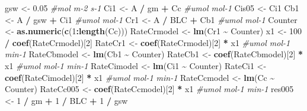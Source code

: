 \documentclass[
]{krantz}
\makeatletter
\newenvironment{Shaded}{\begin{snugshade}}{\end{snugshade}}
\newcommand{\CommentTok}[1]{\textcolor[rgb]{0.56,0.35,0.01}{\textit{#1}}}
\newcommand{\DecValTok}[1]{\textcolor[rgb]{0.00,0.00,0.81}{#1}}
\newcommand{\FloatTok}[1]{\textcolor[rgb]{0.00,0.00,0.81}{#1}}
\newcommand{\KeywordTok}[1]{\textcolor[rgb]{0.13,0.29,0.53}{\textbf{#1}}}
\newcommand{\NormalTok}[1]{#1}
\newcommand{\OperatorTok}[1]{\textcolor[rgb]{0.81,0.36,0.00}{\textbf{#1}}}
\newcommand{\StringTok}[1]{\textcolor[rgb]{0.31,0.60,0.02}{#1}}
\newenvironment{kframe}{%
\medskip{}
\setlength{\fboxsep}{.8em}
 \def\at@end@of@kframe{}%
 \ifinner\ifhmode%
  \def\at@end@of@kframe{\end{minipage}}%
  \begin{minipage}{\columnwidth}%
 \fi\fi%
 \def\FrameCommand##1{\hskip\@totalleftmargin \hskip-\fboxsep
 \colorbox{shadecolor}{##1}\hskip-\fboxsep
     \hskip-\linewidth \hskip-\@totalleftmargin \hskip\columnwidth}%
 \MakeFramed {\advance\hsize-\width
   \@totalleftmargin\z@ \linewidth\hsize
   \@setminipage}}%
 {\par\unskip\endMakeFramed%
 \at@end@of@kframe}
\renewenvironment{Shaded}{\begin{kframe}}{\end{kframe}}
\makeatother
\begin{document}
\begin{Shaded}
\begin{Highlighting}[]
\NormalTok{gsw \textless{}{-}}\StringTok{ }\FloatTok{0.05} \CommentTok{\#mol m{-}2 s{-}1}
\NormalTok{Ci1 \textless{}{-}}\StringTok{ }\NormalTok{A }\OperatorTok{/}\StringTok{ }\NormalTok{gm }\OperatorTok{+}\StringTok{ }\NormalTok{Cc }\CommentTok{\#umol mol{-}1}
\NormalTok{Cis05 \textless{}{-}}\StringTok{ }\NormalTok{Ci1}
\NormalTok{Cb1 \textless{}{-}}\StringTok{ }\NormalTok{A }\OperatorTok{/}\StringTok{ }\NormalTok{gsw }\OperatorTok{+}\StringTok{ }\NormalTok{Ci1 }\CommentTok{\#umol mol{-}1}
\NormalTok{Cr1 \textless{}{-}}\StringTok{ }\NormalTok{A }\OperatorTok{/}\StringTok{ }\NormalTok{BLC }\OperatorTok{+}\StringTok{ }\NormalTok{Cb1 }\CommentTok{\#umol mol{-}1}
\NormalTok{Counter \textless{}{-}}\StringTok{ }\KeywordTok{as.numeric}\NormalTok{(}\KeywordTok{c}\NormalTok{(}\DecValTok{1}\OperatorTok{:}\KeywordTok{length}\NormalTok{(Cc)))}
\NormalTok{RateCrmodel \textless{}{-}}\StringTok{ }\KeywordTok{lm}\NormalTok{(Cr1 }\OperatorTok{\textasciitilde{}}\StringTok{ }\NormalTok{Counter)}
\NormalTok{x1 \textless{}{-}}\StringTok{ }\DecValTok{100} \OperatorTok{/}\StringTok{ }\KeywordTok{coef}\NormalTok{(RateCrmodel)[}\DecValTok{2}\NormalTok{]}
\NormalTok{RateCr1 \textless{}{-}}\StringTok{ }\KeywordTok{coef}\NormalTok{(RateCrmodel)[}\DecValTok{2}\NormalTok{] }\OperatorTok{*}\StringTok{ }\NormalTok{x1 }\CommentTok{\#umol mol{-}1 min{-}1}
\NormalTok{RateCbmodel \textless{}{-}}\StringTok{ }\KeywordTok{lm}\NormalTok{(Cb1 }\OperatorTok{\textasciitilde{}}\StringTok{ }\NormalTok{Counter)}
\NormalTok{RateCb1 \textless{}{-}}\StringTok{ }\KeywordTok{coef}\NormalTok{(RateCbmodel)[}\DecValTok{2}\NormalTok{] }\OperatorTok{*}\StringTok{ }\NormalTok{x1 }\CommentTok{\#umol mol{-}1 min{-}1}
\NormalTok{RateCimodel \textless{}{-}}\StringTok{ }\KeywordTok{lm}\NormalTok{(Ci1 }\OperatorTok{\textasciitilde{}}\StringTok{ }\NormalTok{Counter)}
\NormalTok{RateCi1 \textless{}{-}}\StringTok{ }\KeywordTok{coef}\NormalTok{(RateCimodel)[}\DecValTok{2}\NormalTok{] }\OperatorTok{*}\StringTok{ }\NormalTok{x1 }\CommentTok{\#umol mol{-}1 min{-}1}
\NormalTok{RateCcmodel \textless{}{-}}\StringTok{ }\KeywordTok{lm}\NormalTok{(Cc }\OperatorTok{\textasciitilde{}}\StringTok{ }\NormalTok{Counter)}
\NormalTok{RateCc005 \textless{}{-}}\StringTok{ }\KeywordTok{coef}\NormalTok{(RateCcmodel)[}\DecValTok{2}\NormalTok{] }\OperatorTok{*}\StringTok{ }\NormalTok{x1 }\CommentTok{\#umol mol{-}1 min{-}1}
\NormalTok{res005 \textless{}{-}}\StringTok{ }\DecValTok{1} \OperatorTok{/}\StringTok{ }\NormalTok{gm }\OperatorTok{+}\StringTok{ }\DecValTok{1} \OperatorTok{/}\StringTok{ }\NormalTok{BLC }\OperatorTok{+}\StringTok{ }\DecValTok{1} \OperatorTok{/}\StringTok{ }\NormalTok{gsw}


\end{Highlighting}
\end{Shaded}
\end{document}
